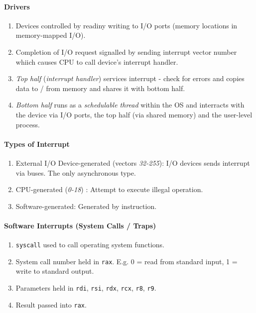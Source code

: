 \documentclass[twocolumn,english]{article}
\begin{document}
\paragraph{Drivers}
\begin{enumerate}
\item Devices controlled by readiny writing to I/O ports (memory locations
in memory-mapped I/O).
\item Completion of I/O request signalled by sending interrupt vector number
whiich causes CPU to call device's interrupt handler.
\item \emph{Top half} (\emph{interrupt handler}) services interrupt - check
for errors and copies data to / from memory and shares it with bottom
half.
\item \emph{Bottom half} runs as a \emph{schedulable thread} within the
OS and interracts with the device via I/O ports, the top half (via
shared memory) and the user-level process.
\end{enumerate}

\paragraph{Types of Interrupt}
\begin{enumerate}
\item External I/O Device-generated (vectors \emph{32-255}): I/O devices
sends interrupt via buses. The only asynchronous type.
\item CPU-generated (\emph{0-18}) : Attempt to execute illegal operation.
\item Software-generated: Generated by instruction.
\end{enumerate}

\paragraph{Software Interrupts (System Calls / Traps)}
\begin{enumerate}
\item \texttt{syscall} used to call operating system functions.
\item System call number held in \texttt{rax}. E.g. 0 = read from standard
input, 1 = write to standard output.
\item Parameters held in \texttt{rdi}, \texttt{rsi}, \texttt{rdx}, \texttt{rcx},
\texttt{r8}, \texttt{r9}.
\item Result passed into \texttt{rax}.\end{enumerate}
\end{document}
